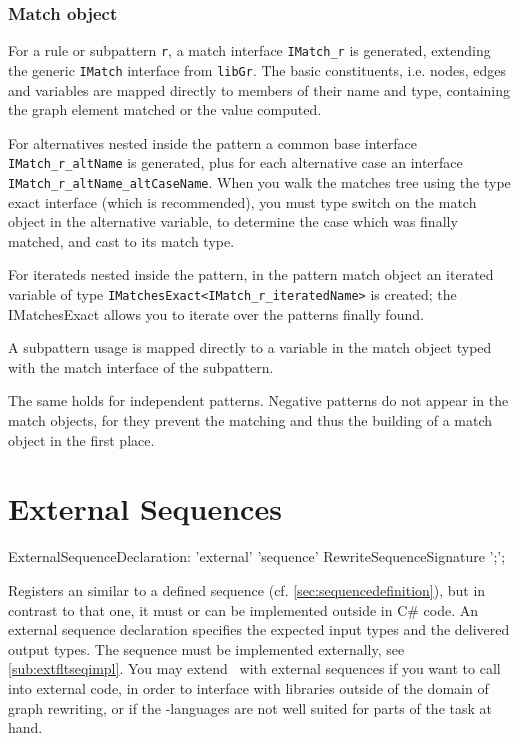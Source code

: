 \subsubsection*{Match object}

For a rule or subpattern \texttt{r}, a match interface \texttt{IMatch\_r} is generated, extending the generic \texttt{IMatch} interface from \texttt{libGr}.
The basic constituents, i.e. nodes, edges and variables are mapped directly to members of their name and type, containing the graph element matched or the value computed.

For alternatives nested inside the pattern a common base interface \texttt{IMatch\_r\_altName} is generated, plus for each alternative case an interface \texttt{IMatch\_r\_altName\_altCaseName}.
When you walk the matches tree using the type exact interface (which is recommended), you must type switch on the match object in the alternative variable, to determine the case which was finally matched, and cast to its match type.

For iterateds nested inside the pattern, in the pattern match object an iterated variable of type \texttt{IMatchesExact<IMatch\_r\_iteratedName>} is created; the IMatchesExact allows you to iterate over the patterns finally found. 

A subpattern usage is mapped directly to a variable in the match object typed with the match interface of the subpattern.

The same holds for independent patterns.
Negative patterns do not appear in the match objects, for they prevent the matching and thus the building of a match object in the first place.

\section{External Sequences}\label{sub:extseq}
\begin{rail}
  ExternalSequenceDeclaration: 
    'external' 'sequence' RewriteSequenceSignature ';';
\end{rail}
Registers an  similar to a defined sequence (cf. \ref{sec:sequencedefinition}), but in contrast to that one, it must or can be implemented outside in C\# code.
An external sequence declaration specifies the expected input types and the delivered output types.
The sequence must be implemented externally, see \ref{sub:extfltseqimpl}.
You may extend \GrG~with external sequences if you want to call into external code,
in order to interface with libraries outside of the domain of graph rewriting, 
or if the \GrG-languages are not well suited for parts of the task at hand.

